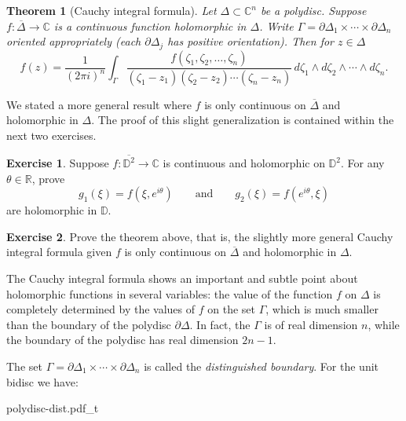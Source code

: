 \documentclass[12pt,openany]{book}
\newcommand{\C}{{\mathbb{C}}}
\newcommand{\R}{{\mathbb{R}}}
\newcommand{\D}{{\mathbb{D}}}
\newcommand{\myindex}[1]{#1\index{#1}}
\theoremstyle{plain}
\newtheorem{thm}{Theorem}[section]
\theoremstyle{remark}
\theoremstyle{definition}
\newenvironment{exbox}{%
    \def\FrameCommand{\vrule width 1pt \relax\hspace {10pt}}%
    \MakeFramed {\advance \hsize -\width \FrameRestore }%
}{%
    \endMakeFramed
}
\theoremstyle{exercise}
\newtheorem{exercise}{Exercise}[section]
\theoremstyle{example}
\begin{document}
\begin{thm}[Cauchy integral formula]
Let $\Delta \subset \C^n$ be a polydisc. 
Suppose
$f \colon \overline{\Delta} \to \C$ is a continuous function
holomorphic in $\Delta$.
Write $\Gamma = \partial \Delta_1 \times \cdots \times \partial \Delta_n$
oriented appropriately (each $\partial \Delta_j$ has positive orientation).
Then for $z \in \Delta$
\begin{equation*}
f(z) =
\frac{1}{{(2\pi i)}^n}
\int_{\Gamma}
\frac{f(\zeta_1,\zeta_2,\ldots,\zeta_n)}{(\zeta_1-z_1)(\zeta_2-z_2)\cdots(\zeta_n-z_n)}
\,
d \zeta_1 
\wedge
d \zeta_2
\wedge
\cdots
\wedge
d \zeta_n .
\end{equation*}
\end{thm}

We stated a more general result where $f$ is only continuous 
on $\overline{\Delta}$ and holomorphic in $\Delta$.  The proof of this
slight generalization is contained within the next two exercises.

\begin{exbox}
\begin{exercise}
Suppose $f \colon \overline{\D^2} \to \C$ is continuous and holomorphic
on $\D^2$.  For any $\theta \in \R$, prove
\begin{equation*}
g_1(\xi) = f(\xi,e^{i\theta}) \qquad \text{and} \qquad
g_2(\xi) = f(e^{i\theta},\xi)
\end{equation*}
are holomorphic in $\D$.
\end{exercise}

\begin{exercise}
Prove the theorem above, that is, the slightly more general Cauchy integral
formula given $f$ is only continuous on $\overline{\Delta}$ and
holomorphic in $\Delta$.
\end{exercise}
\end{exbox}


The Cauchy integral formula shows
an important and subtle point about holomorphic functions in several
variables:
the value of
the function $f$ on $\Delta$ is completely determined by the values of $f$ on
the set $\Gamma$, which is much smaller than the boundary of the polydisc
$\partial \Delta$.  In fact, the $\Gamma$ is of real dimension $n$, while
the boundary of the polydisc has real dimension $2n-1$.

\begin{samepage}
The set $\Gamma = \partial \Delta_1 \times \cdots \times \partial \Delta_n$
is called the \emph{\myindex{distinguished boundary}}.  For
the unit bidisc we have:


\begin{center}
{polydisc-dist.pdf_t}
\end{center}
\end{samepage}
\end{document}
